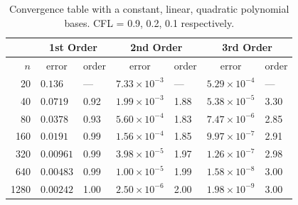    \begin{table}
      \centering
      \begin{tabular}{r*{6}l}
        \toprule
        & \multicolumn{2}{c}{1st Order} & \multicolumn{2}{c}{2nd Order} & \multicolumn{2}{c}{3rd Order} \\
        \midrule
        \(n\) & \multicolumn{1}{c}{error} & order & \multicolumn{1}{c}{error} & order & \multicolumn{1}{c}{error} & order\\
        \midrule
          20 &   \(0.136\) &  --- & \(7.33 \times 10^{-3}\) &  --- & \(5.29 \times 10^{-4}\) &  --- \\
          40 &  \(0.0719\) & 0.92 & \(1.99 \times 10^{-3}\) & 1.88 & \(5.38 \times 10^{-5}\) & 3.30 \\
          80 &  \(0.0378\) & 0.93 & \(5.60 \times 10^{-4}\) & 1.83 & \(7.47 \times 10^{-6}\) & 2.85 \\
         160 &  \(0.0191\) & 0.99 & \(1.56 \times 10^{-4}\) & 1.85 & \(9.97 \times 10^{-7}\) & 2.91 \\
         320 & \(0.00961\) & 0.99 & \(3.98 \times 10^{-5}\) & 1.97 & \(1.26 \times 10^{-7}\) & 2.98 \\
         640 & \(0.00483\) & 0.99 & \(1.00 \times 10^{-5}\) & 1.99 & \(1.58 \times 10^{-8}\) & 3.00 \\
        1280 & \(0.00242\) & 1.00 & \(2.50 \times 10^{-6}\) & 2.00 & \(1.98 \times 10^{-9}\) & 3.00 \\
        \bottomrule
      \end{tabular}
      \caption{Convergence table with a constant, linear, quadratic polynomial bases.
      CFL = 0.9, 0.2, 0.1 respectively.}\label{tab:convergence_results}
    \end{table}

